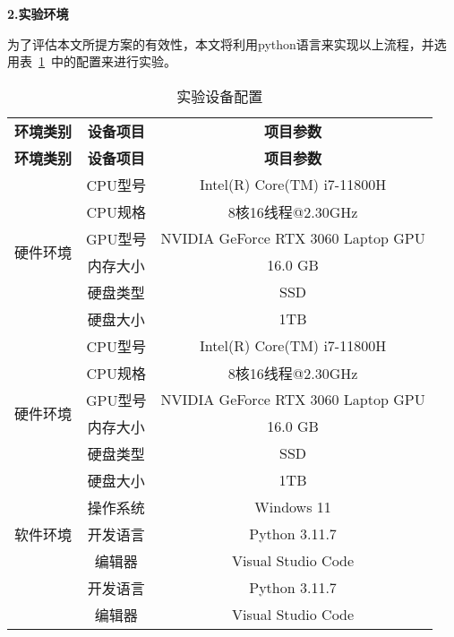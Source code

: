 \textbf{2.实验环境}\par
为了评估本文所提方案的有效性，本文将利用python语言来实现以上流程，并选用表~\ref{tab:env_setting}~中的配置来进行实验。
\begin{table}[htbp]
	\caption{实验设备配置}
	\label{tab:env_setting}
	\centering
	\begin{tabular}{ccc}
		\toprule
		\textbf{环境类别}         & \textbf{设备项目} & \textbf{项目参数}                  \\
		\textbf{环境类别}         & \textbf{设备项目} & \textbf{项目参数}                  \\
		\midrule
		\multirow{6}{*}{硬件环境} & CPU型号           & Intel(R) Core(TM) i7-11800H        \\
		                          & CPU规格           & 8核16线程@2.30GHz                  \\
		                          & GPU型号           & NVIDIA GeForce RTX 3060 Laptop GPU \\
		                          & 内存大小          & 16.0 GB                            \\
		                          & 硬盘类型          & SSD                                \\
		                          & 硬盘大小          & 1TB                                \\
		\multirow{6}{*}{硬件环境} & CPU型号           & Intel(R) Core(TM) i7-11800H        \\
		                          & CPU规格           & 8核16线程@2.30GHz                  \\
		                          & GPU型号           & NVIDIA GeForce RTX 3060 Laptop GPU \\
		                          & 内存大小          & 16.0 GB                            \\
		                          & 硬盘类型          & SSD                                \\
		                          & 硬盘大小          & 1TB                                \\
		\hline
		\multirow{3}{*}{软件环境} & 操作系统          & Windows 11                         \\
		                          & 开发语言          & Python 3.11.7                      \\
		                          & 编辑器            & Visual Studio Code                 \\
		                          & 开发语言          & Python 3.11.7                      \\
		                          & 编辑器            & Visual Studio Code                 \\
		\bottomrule
	\end{tabular}
\end{table}

